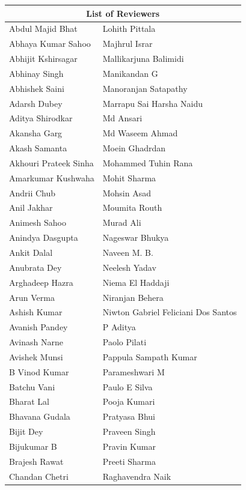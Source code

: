 \clearpage

	\begin{longtable}{ll}
	\multicolumn{2}{c}{\textbf{List of Reviewers}} \\
	\midrule
		Abdul Majid Bhat & Lohith Pittala \\  
		Abhaya Kumar Sahoo & Majhrul Israr \\  
		Abhijit Kshirsagar & Mallikarjuna Balimidi \\  
		Abhinay Singh & Manikandan G \\  
		Abhishek Saini & Manoranjan Satapathy \\  
		Adarsh Dubey & Marrapu Sai Harsha Naidu \\  
		Aditya Shirodkar & Md Ansari \\  
		Akansha Garg & Md Waseem Ahmad \\  
		Akash Samanta & Moein Ghadrdan \\  
		Akhouri Prateek Sinha & Mohammed Tuhin Rana \\  
		Amarkumar Kushwaha & Mohit Sharma \\  
		Andrii Chub & Mohsin Asad \\  
		Anil Jakhar & Moumita Routh \\  
		Animesh Sahoo & Murad Ali \\  
		Anindya Dasgupta & Nageswar Bhukya \\  
		Ankit Dalal & Naveen M. B. \\  
		Anubrata Dey & Neelesh Yadav \\  
		Arghadeep Hazra & Niema El Haddaji \\  
		Arun Verma & Niranjan Behera \\  
		Ashish Kumar & Niwton Gabriel Feliciani Dos Santos \\  
		Avanish Pandey & P Aditya \\  
		Avinash Narne & Paolo Pilati \\  
		Avishek Munsi & Pappula Sampath Kumar \\  
		B Vinod Kumar & Parameshwari M \\  
		Batchu Vani & Paulo E Silva \\  
		Bharat Lal & Pooja Kumari \\  
		Bhavana Gudala & Pratyasa Bhui \\  
		Bijit Dey & Praveen Singh \\  
		Bijukumar B & Pravin Kumar \\  
		Brajesh Rawat & Preeti Sharma \\  
		Chandan Chetri & Raghavendra Naik \\  

\end{longtable}

